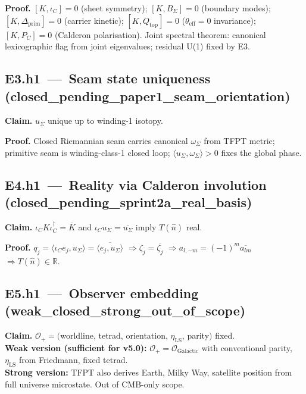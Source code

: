 \textbf{Proof.}
\([K,\iota_C]=0\) (sheet symmetry); \([K,B_\Sigma]=0\) (boundary
modes); \([K,\Delta_{\mathrm{prim}}]=0\) (carrier kinetic);
\([K,Q_{\mathrm{top}}]=0\) (\(\theta_{\mathrm{eff}}=0\) invariance);
\([K,P_C]=0\) (Calderon polarisation).  Joint spectral theorem:
canonical lexicographic flag from joint eigenvalues; residual U(1)
fixed by E3.  

\subsection*{E3.h1 \,---\, Seam state uniqueness
\,(\textsf{closed\_pending\_paper1\_seam\_orientation})}
\textbf{Claim.} \(u_\Sigma\) unique up to winding-1 isotopy.

\textbf{Proof.}
Closed Riemannian seam carries canonical \(\omega_\Sigma\) from TFPT
metric; primitive seam is winding-class-1 closed loop;
\(\langle u_\Sigma,\omega_\Sigma\rangle>0\) fixes the global phase.

\subsection*{E4.h1 \,---\, Reality via Calderon involution
\,(\textsf{closed\_pending\_sprint2a\_real\_basis})}
\textbf{Claim.}
\(\iota_C K\iota_C^\dagger=\overline{K}\) and
\(\iota_C u_\Sigma=\overline{u_\Sigma}\) imply \(T(\hat n)\) real.

\textbf{Proof.}
\(q_{\bar j}=\langle\iota_C e_j,u_\Sigma\rangle=
\overline{\langle e_j,u_\Sigma\rangle}\)
\(\Rightarrow\zeta_{\bar j}=\overline{\zeta_j}\)
\(\Rightarrow a_{l,-m}=(-1)^m\overline{a_{lm}}\)
\(\Rightarrow T(\hat n)\in\mathbb R\).

\subsection*{E5.h1 \,---\, Observer embedding
\,(\textsf{weak\_closed\_strong\_out\_of\_scope})}
\textbf{Claim.}
\(\mathcal O_+=(\)worldline, tetrad, orientation, \(\eta_{\mathrm{LS}}\),
parity\()\) fixed.\\
\textbf{Weak version (sufficient for v5.0):}
\(\mathcal O_+=\mathcal O_{\mathrm{Galactic}}\) with conventional
parity, \(\eta_{\mathrm{LS}}\) from Friedmann, fixed tetrad.\\
\textbf{Strong version:} TFPT also derives Earth, Milky Way,
satellite position from full universe microstate.  Out of CMB-only
scope.

